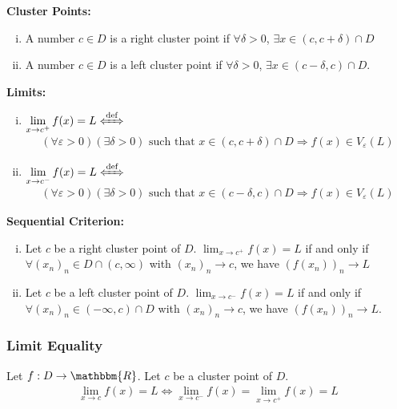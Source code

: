\documentclass[10pt]{extarticle}
\newcommand{\R}{\mathbbm{R}}
\begin{document}
    \textbf{Cluster Points:}
    \begin{enumerate}[(i)]
      \item A number $c\in D$ is a right cluster point if $\forall \delta > 0$, $\exists x\in (c,c+\delta) \cap D$
      \item A number $c\in D$ is a left cluster point if $\forall \delta > 0$, $\exists x\in (c-\delta,c) \cap D$.
    \end{enumerate}
    \textbf{Limits:}
    \begin{enumerate}[(i)]
      \item $\displaystyle \lim_{x\rightarrow c^{+}} f(x) = L \xLeftrightarrow{\text{def}}$
        \begin{align*}
          (\forall \varepsilon > 0)(\exists \delta > 0) \text{ such that } x\in (c,c+\delta)\cap D \Rightarrow f(x)\in V_{\varepsilon}(L)
        \end{align*}
      \item $\displaystyle \lim_{x\rightarrow c^{-}} f(x) = L \xLeftrightarrow{\text{def}}$
        \begin{align*}
          (\forall \varepsilon > 0)(\exists \delta > 0) \text{ such that } x\in (c-\delta,c) \cap D \Rightarrow f(x)\in V_{\varepsilon}(L)
        \end{align*}
    \end{enumerate}
    \textbf{Sequential Criterion:}
    \begin{enumerate}[(i)]
      \item Let $c$ be a right cluster point of $D$. $\lim_{x\rightarrow c^{+}} f(x) = L$ if and only if $\forall (x_n)_n \in D\cap (c,\infty)$ with $(x_n)_n \rightarrow c$, we have $(f(x_n))_n \rightarrow L$
      \item Let $c$ be a left cluster point of $D$. $\lim_{x\rightarrow c^{-}} f(x) = L$ if and only if $\forall (x_n)_n \in (-\infty,c) \cap D$ with $(x_n)_n \rightarrow c$, we have $(f(x_n))_n \rightarrow L$.
    \end{enumerate}
    \subsubsection{Limit Equality}%
    Let $f:D\rightarrow \R$. Let $c$ be a cluster point of $D$.
    \begin{align*}
      \lim_{x\rightarrow c}f(x) = L \Leftrightarrow \lim_{x\rightarrow c^{-}}f(x) = \lim_{x\rightarrow c^{+}}f(x) = L
    \end{align*}
\end{document}
